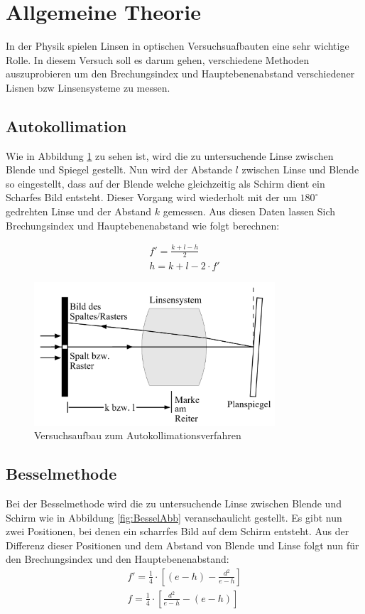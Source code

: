 \documentclass[11pt, a4paper]{article}
\begin{document}
    \section{Allgemeine Theorie}
    \FloatBarrier
    In der Physik spielen Linsen in optischen Versuchsuafbauten eine sehr wichtige Rolle. In diesem Versuch soll es darum gehen, verschiedene 
    Methoden auszuprobieren um den Brechungsindex und Hauptebenenabstand verschiedener Lisnen bzw Linsensysteme zu messen.
    \subsection{Autokollimation}
    Wie in Abbildung \ref{fig:autoKollAbb} zu sehen ist, wird die zu untersuchende Linse zwischen Blende und Spiegel gestellt. Nun wird der Abstande $l$ zwischen 
    Linse und Blende so eingestellt, dass auf der Blende welche gleichzeitig als Schirm dient ein Scharfes Bild entsteht. Dieser Vorgang wird wiederholt mit der um $180^\circ$ gedrehten Linse und der Abstand $k$ gemessen.
    Aus diesen Daten lassen Sich Brechungsindex und Hauptebenenabstand wie folgt berechnen:

    \begin{align}
    f' = \frac{k+l-h}{2} \label{eq:autokollBrech}\\
    h = k + l - 2 \cdot f' \label{eq:autokollHaupt}
    \end{align}

    \begin{figure}
        \centering
        \includegraphics[width=0.8\textwidth]{Autokollimation_abb.png}
        \caption{Versuchsaufbau zum Autokollimationsverfahren \cite{OPA}}   %
        \label{fig:autoKollAbb}
    \end{figure}

    \subsection{Besselmethode}
    Bei der Besselmethode wird die zu untersuchende Linse zwischen Blende und Schirm wie in Abbildung \ref{fig:BesselAbb} veranschaulicht gestellt.
    Es gibt nun zwei Positionen, bei denen ein scharrfes Bild auf dem Schirm entsteht. Aus der Differenz dieser Positionen und dem Abstand von Blende und Linse folgt nun für den Brechungsindex und den Hauptebenenabstand:
    \begin{align}
        f' = \frac{1}{4} \cdot [(e-h)-\frac{d^2}{e-h}] \label{eq:besselBrech1}\\
        f = \frac{1}{4} \cdot [\frac{d^2}{e-h}-(e-h)] \label{eq:besselBrech2}
    \end{align}
    
\end{document}
